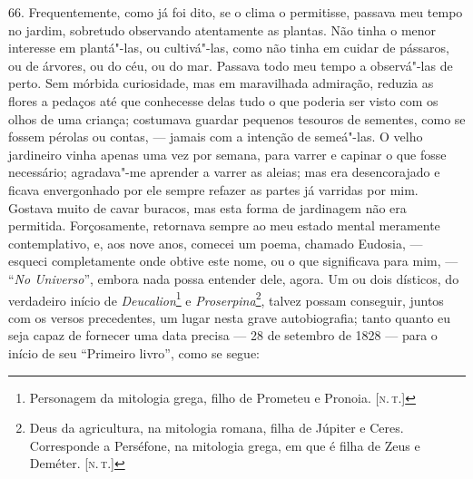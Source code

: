66. Frequentemente, como já foi dito, se o clima o permitisse, passava
meu tempo no jardim, sobretudo observando atentamente as plantas. Não
tinha o menor interesse em plantá"-las, ou cultivá"-las, como não tinha em
cuidar de pássaros, ou de árvores, ou do céu, ou do mar. Passava todo
meu tempo a observá"-las de perto. Sem mórbida curiosidade, mas em
maravilhada admiração, reduzia as flores a pedaços até que conhecesse
delas tudo o que poderia ser visto com os olhos de uma criança;
costumava guardar pequenos tesouros de sementes, como se fossem pérolas
ou contas, --- jamais com a intenção de semeá"-las. O velho jardineiro
vinha apenas uma vez por semana, para varrer e capinar o que fosse
necessário; agradava"-me aprender a varrer as aleias; mas era
desencorajado e ficava envergonhado por ele sempre refazer as partes já
varridas por mim. Gostava muito de cavar buracos, mas esta forma de
jardinagem não era permitida. Forçosamente, retornava sempre ao meu
estado mental meramente contemplativo, e, aos nove anos, comecei um
poema, chamado Eudosia, --- esqueci completamente onde obtive este nome,
ou o que significava para mim, --- ``\emph{No Universo}'', embora nada
possa entender dele, agora. Um ou dois dísticos, do verdadeiro início de
\emph{Deucalion}\footnote{Personagem da mitologia grega, filho de
  Prometeu e Pronoia. {[}\textsc{n.\,t.}{]}} e \emph{Proserpina}\footnote{Deus
  da agricultura, na mitologia romana, filha de Júpiter e Ceres.
  Corresponde a Perséfone, na mitologia grega, em que é filha de Zeus e
  Deméter. {[}\textsc{n.\,t.}{]}}, talvez possam conseguir, juntos com os
versos precedentes, um lugar nesta grave autobiografia; tanto quanto eu
seja capaz de fornecer uma data precisa --- 28 de setembro de 1828 ---
para o início de seu ``Primeiro livro'', como se segue: %

